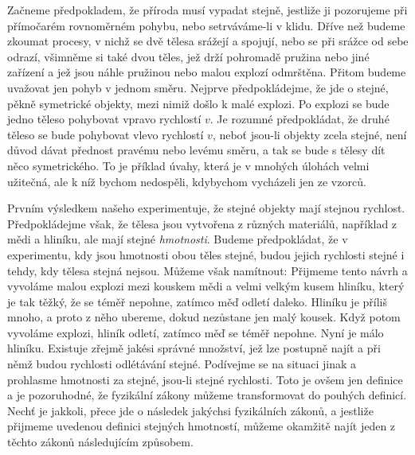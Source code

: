 {    Začneme předpokladem, že příroda musí vypadat stejně, jestliže ji pozorujeme při přímočarém 
    rovnoměrném pohybu, nebo setrváváme-li v klidu. Dříve než budeme zkoumat procesy, v nichž se 
    dvě tělesa srážejí a spojují, nebo se při srážce od sebe odrazí, všimněme si také dvou těles, 
    jež drží pohromadě pružina nebo jiné zařízení a jež jsou náhle pružinou nebo malou explozí 
    odmrštěna. Přitom budeme uvažovat jen pohyb v jednom směru. Nejprve předpokládejme, že jde o 
    stejné, pěkně symetrické objekty, mezi nimiž došlo k malé explozi. Po explozi se bude jedno 
    těleso pohybovat vpravo rychlostí \(v\). Je rozumné předpokládat, že druhé těleso se bude 
    pohybovat vlevo rychlostí \(v\), neboť jsou-li objekty zcela stejné, není důvod dávat přednost 
    pravému nebo levému směru, a tak se bude s tělesy dít něco symetrického. To je příklad úvahy, 
    která je v mnohých úlohách velmi užitečná, ale k níž bychom nedospěli, kdybychom vycházeli jen 
    ze vzorců.
    
    Prvním výsledkem našeho experimentuje, že stejné objekty mají stejnou rychlost. Předpokládejme 
    však, že tělesa jsou vytvořena z různých materiálů, například z mědi a hliníku, ale mají stejné 
    \emph{hmotnosti}. Budeme předpokládat, že v experimentu, kdy jsou hmotnosti obou těles stejné, 
    budou jejich rychlosti stejné i tehdy, kdy tělesa stejná nejsou. Můžeme však namítnout:  
    Přijmeme tento návrh a vyvoláme malou explozi mezi kouskem mědi a velmi velkým kusem hliníku, 
    který je tak těžký, že se téměř nepohne, zatímco měď odletí daleko. Hliníku je příliš mnoho, a 
    proto z něho ubereme, dokud nezůstane jen malý kousek. Když potom vyvoláme explozi, hliník 
    odletí, zatímco měď se téměř nepohne. Nyní je málo hliníku. Existuje zřejmě jakési správné 
    množství, jež lze postupně najít a při němž budou rychlosti odlétávání stejné. Podívejme se na 
    situaci jinak a prohlasme hmotnosti za stejné, jsou-li stejné rychlosti. Toto je ovšem jen 
    definice a je pozoruhodné, že fyzikální zákony můžeme transformovat do pouhých definicí. Nechť 
    je jakkoli, přece jde o následek jakýchsi fyzikálních zákonů, a jestliže přijmeme uvedenou 
    definici stejných hmotností, můžeme okamžitě najít jeden z těchto zákonů následujícím způsobem.
    
}
